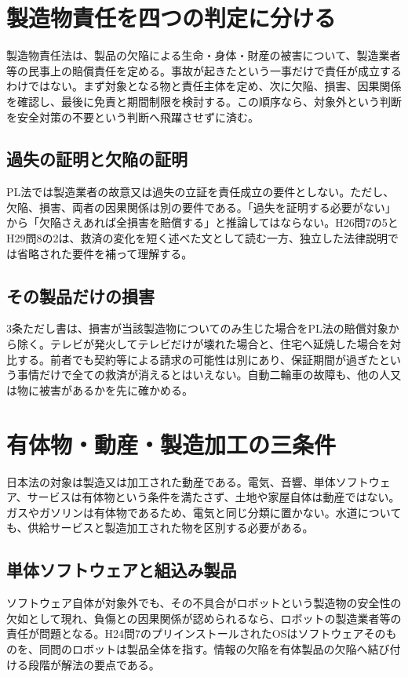 \section{製造物責任を四つの判定に分ける}
\label{theory:pl:framework}
製造物責任法は、製品の欠陥による生命・身体・財産の被害について、製造業者等の民事上の賠償責任を定める。事故が起きたという一事だけで責任が成立するわけではない。まず対象となる物と責任主体を定め、次に欠陥、損害、因果関係を確認し、最後に免責と期間制限を検討する。この順序なら、対象外という判断を安全対策の不要という判断へ飛躍させずに済む。\autocite{pl_statute,pl_qa}

\subsection{過失の証明と欠陥の証明}
\label{theory:pl:proof}
PL法では製造業者の故意又は過失の立証を責任成立の要件としない。ただし、欠陥、損害、両者の因果関係は別の要件である。「過失を証明する必要がない」から「欠陥さえあれば全損害を賠償する」と推論してはならない。H26問7の5とH29問8の2は、救済の変化を短く述べた文として読む一方、独立した法律説明では省略された要件を補って理解する。

\subsection{その製品だけの損害}
\label{theory:pl:selfdamage}
3条ただし書は、損害が当該製造物についてのみ生じた場合をPL法の賠償対象から除く。テレビが発火してテレビだけが壊れた場合と、住宅へ延焼した場合を対比する。前者でも契約等による請求の可能性は別にあり、保証期間が過ぎたという事情だけで全ての救済が消えるとはいえない。自動二輪車の故障も、他の人又は物に被害があるかを先に確かめる。\autocite{pl_statute,pl_qa}

\section{有体物・動産・製造加工の三条件}
\label{theory:pl:scope}
日本法の対象は製造又は加工された動産である。電気、音響、単体ソフトウェア、サービスは有体物という条件を満たさず、土地や家屋自体は動産ではない。ガスやガソリンは有体物であるため、電気と同じ分類に置かない。水道についても、供給サービスと製造加工された物を区別する必要がある。\autocite{pl_definitions2018,pl_qa}

\subsection{単体ソフトウェアと組込み製品}
\label{theory:pl:software}
ソフトウェア自体が対象外でも、その不具合がロボットという製造物の安全性の欠如として現れ、負傷との因果関係が認められるなら、ロボットの製造業者等の責任が問題となる。H24問7のプリインストールされたOSはソフトウェアそのものを、同問のロボットは製品全体を指す。情報の欠陥を有体製品の欠陥へ結び付ける段階が解法の要点である。


